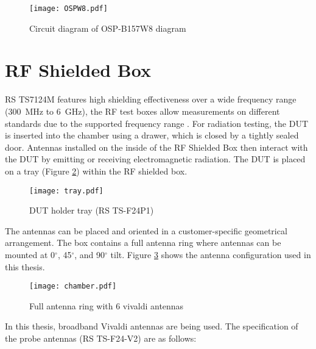 \begin{figure}[H]
\centering
\texttt{[image: OSPW8.pdf]}
\caption{Circuit diagram of \acs{OSP}-B157W8 diagram \cite{ospw8}}
\label{fig:ospw8}
\end{figure}



\section{\acs{RF} Shielded Box}
\acs{RS}\textregistered{} TS7124M features high shielding effectiveness over a wide frequency range (300~MHz to 6~GHz), the \acs{RF} test boxes allow measurements on different standards due to the supported frequency range \cite{ts7124}. For radiation testing, the \acs{DUT} is inserted into the chamber using a drawer, which is closed by a tightly sealed door. Antennas installed on the inside of the \acs{RF} Shielded Box then interact with the \acs{DUT} by emitting or receiving electromagnetic radiation. The \acs{DUT} is placed on a tray (Figure \ref{fig:try}) within the \acs{RF} shielded box.

\begin{figure}[H]
\centering
\texttt{[image: tray.pdf]}
\caption{ DUT holder tray (\acs{RS}\textregistered{} TS-F24P1) \cite{ts7124}}
\label{fig:try}
\end{figure}

The antennas can be placed and oriented in a customer-specific geometrical arrangement. The box contains a full antenna ring where antennas can be mounted at 0$^{\circ}$, 45$^{\circ}$, and 90$^{\circ}$ tilt. Figure \ref{fig:box} shows the antenna configuration used in this thesis.

\begin{figure}[H]
\centering
\texttt{[image: chamber.pdf]}
\vspace{-0.4cm} \caption{Full antenna ring with 6 vivaldi antennas}
\label{fig:box}
\end{figure}

In this thesis, broadband Vivaldi antennas are being used. The specification of the probe antennas (\acs{RS}\textregistered{} TS-F24-V2) are as follows: 



